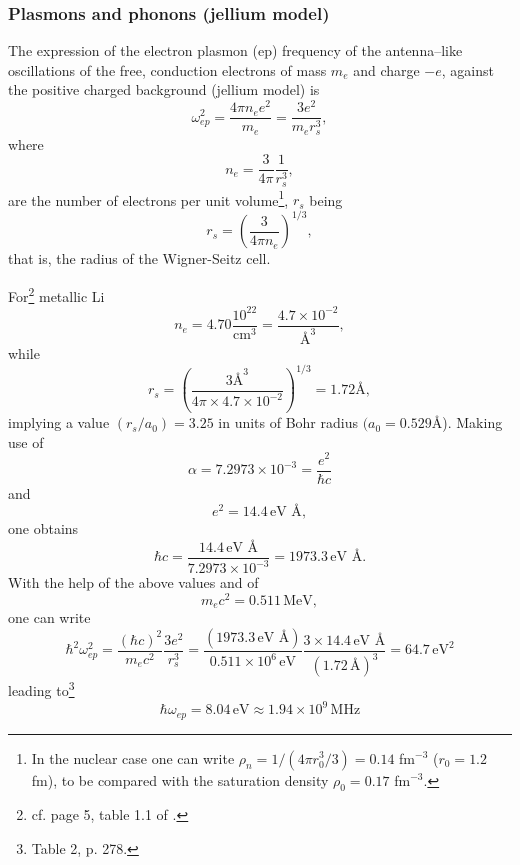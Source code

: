 \subsubsection{Plasmons and phonons (jellium model)}
The expression of the electron plasmon (ep) frequency of the antenna--like oscillations of the free, conduction electrons of mass $m_e$ and charge $-e$, against the positive charged background (jellium model) is
\begin{equation}\label{eq3.A.33}
\omega_{ep}^2=\frac{4\pi n_e e^2}{m_e}=\frac{3e^2}{m_er_s^3},
\end{equation}
where 
\begin{equation}
n_e=\frac{3}{4\pi}\frac{1}{r_s^3},
\end{equation}
are the number of electrons per unit volume\footnote{In the nuclear case one can write $\rho_n=1/(4\pi r_0^3/3)=0.14$ fm$^{-3}$ ($r_0=1.2$ fm), to be compared with the saturation density $\rho_0=0.17$ fm$^{-3}$.}, $r_s$ being
\begin{equation}
r_s=\left(\frac{3}{4\pi n_e}\right)^{1/3},
\end{equation}
that is, the radius of the Wigner-Seitz cell.


For\footnote{cf. page 5, table 1.1 of \cite{Ashcroft:87}.} metallic Li
\begin{equation}
n_e=4.70\frac{10^{22}}{\text{cm}^3}=\frac{4.7\times10^{-2}}{\text{\AA{}}^3},
\end{equation}
while
\begin{equation}
r_s=\left(\frac{3\text{\AA}^3}{4\pi\times4.7\times10^{-2}}\right)^{1/3}=1.72\text{\AA},
\end{equation}
implying a value $(r_s/a_0)=3.25$ in units of  Bohr radius $(a_0=0.529$\AA).
Making use of 
\begin{equation}
\alpha=7.2973\times10^{-3}=\frac{e^2}{\hbar c}
\end{equation}
and
\begin{equation}
e^2=14.4\,\text{eV \AA},
\end{equation}
one obtains
\begin{equation}
\hbar c=\frac{14.4\,\text{eV \AA}}{7.2973\times10^{-3}}=1973.3\,\text{eV \AA}.
\end{equation}
With the help of the above values and of
\begin{equation}
m_ec^2=0.511\,\text{MeV},
\end{equation}
one can write
\begin{equation}
\hbar^2\omega^2_{ep}=\frac{(\hbar c)^2}{m_e c^2}\frac{3e^2}{r_s^3}=\frac{(1973.3\,\text{eV \AA})}{0.511\times10^6\,\text{eV}}\frac{3\times14.4\,\text{eV \AA}}{(1.72\,\text{\AA})^3}=64.7\,\text{eV}^2
\end{equation}
leading to\footnote{\cite{Kittel:96} Table 2, p. 278.}
\begin{equation}
\hbar\omega_{ep}=8.04\,\text{eV}\approx 1.94\times 10^9\,\text{MHz}
\end{equation}


